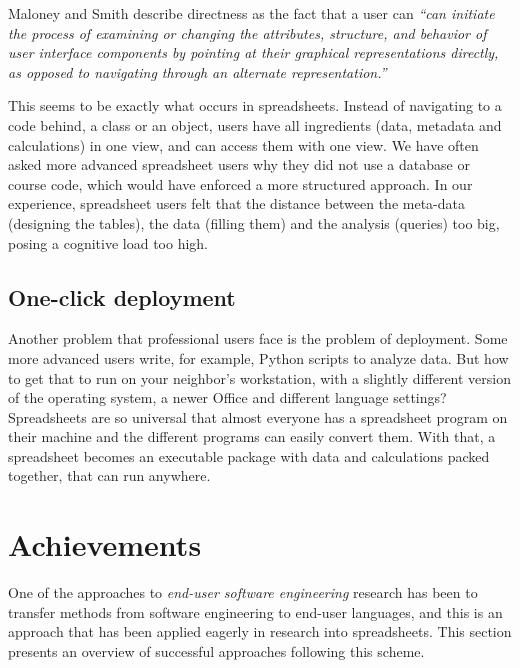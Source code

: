 \documentclass[conference]{IEEEtran}
\begin{document}
Maloney and Smith describe directness as the fact that a user can  \emph{``can initiate the process of examining or changing the attributes, structure, and behavior of user interface components by pointing at their graphical representations directly, as opposed to navigating through an alternate representation.''}~\cite{maloney_directness_1995}

This seems to be exactly what occurs in spreadsheets. Instead of navigating to a code behind, a class or an object, users have all ingredients (data, metadata and calculations) in one view, and can access them with one view. We have often asked more advanced spreadsheet users why they did not use a database or course code, which would have enforced a more structured approach. In our experience, spreadsheet users felt that the distance between the meta-data (designing the tables), the data (filling them) and the analysis (queries) too big, posing a cognitive load too high.


\subsection{One-click deployment}
Another problem that professional users face is the problem of deployment. Some more advanced users write, for example, Python scripts to analyze data. But how to get that to run on your neighbor's workstation, with a slightly different version of the operating system, a newer Office and different language settings? Spreadsheets are so universal that almost everyone has a spreadsheet program on their machine and the different programs can easily convert them. With that, a spreadsheet becomes an executable package with data and calculations packed together, that can run anywhere.

\section{Achievements} 
One of the approaches to \emph{end-user software engineering} research has been to transfer methods from software engineering to end-user languages, and this is an approach that has been applied eagerly in research into spreadsheets. This section presents an overview of successful approaches following this scheme.
\end{document}
